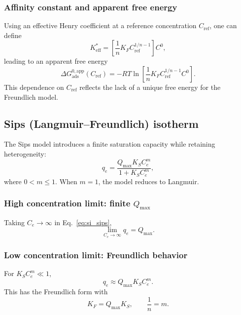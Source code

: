 \documentclass[journal=aamick,manuscript=article]{achemso}
\begin{document}
\subsubsection{Affinity constant and apparent free energy}

Using an effective Henry coefficient at a reference concentration
\(C_{\mathrm{ref}}\), one can define
\begin{equation}
	K_{\mathrm{eff}}^{\ast}
	= \left[\frac{1}{n} K_F C_{\mathrm{ref}}^{1/n - 1}\right] C^0,
\end{equation}
leading to an apparent free energy
\begin{equation}
	\Delta G_{\mathrm{ads}}^{0,\mathrm{app}}(C_{\mathrm{ref}})
	= - R T \ln\!\left[
	\frac{1}{n} K_F C_{\mathrm{ref}}^{1/n - 1} C^0 \right].
\end{equation}
This dependence on \(C_{\mathrm{ref}}\) reflects the lack of a unique
free energy for the Freundlich model.

\subsection{Sips (Langmuir--Freundlich) isotherm}
\label{sec:si_sips}

The Sips model introduces a finite saturation capacity while retaining
heterogeneity:
\begin{equation}
	q_e = \frac{Q_{\max} K_S C_e^{m}}{1 + K_S C_e^{m}},
	\label{eq:si_sips}
\end{equation}
where \(0 < m \leq 1\). When \(m = 1\), the model reduces to Langmuir.

\subsubsection{High concentration limit: finite \(Q_{\max}\)}

Taking \(C_e \to \infty\) in Eq.~\eqref{eq:si_sips},
\begin{equation}
	\lim_{C_e \to \infty} q_e = Q_{\max}.
\end{equation}

\subsubsection{Low concentration limit: Freundlich behavior}

For \(K_S C_e^{m} \ll 1\),
\begin{equation}
	q_e \approx Q_{\max} K_S C_e^{m}.
\end{equation}
This has the Freundlich form with
\begin{equation}
	K_F = Q_{\max} K_S,
	\qquad \frac{1}{n} = m.
\end{equation}
\end{document}
